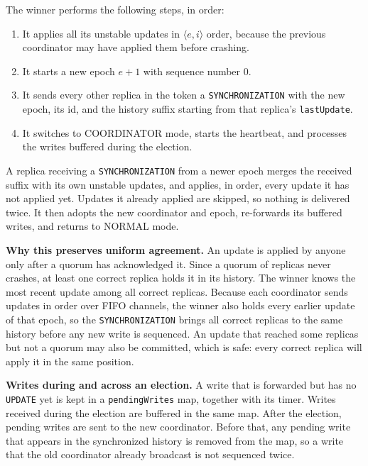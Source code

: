 The winner performs the following steps, in order:

\begin{enumerate}[nosep]
    \item It applies all its unstable updates in $\langle e,i\rangle$ order, because the previous coordinator may have applied them before crashing.
    \item It starts a new epoch $e+1$ with sequence number $0$.
    \item It sends every other replica in the token a \texttt{SYNCHRONIZATION} with the new epoch, its id, and the history suffix starting from that replica's \texttt{lastUpdate}.
    \item It switches to COORDINATOR mode, starts the heartbeat, and processes the writes buffered during the election.
\end{enumerate}

A replica receiving a \texttt{SYNCHRONIZATION} from a newer epoch merges the received suffix with its own unstable updates, and applies, in order, every update it has not applied yet. Updates it already applied are skipped, so nothing is delivered twice. It then adopts the new coordinator and epoch, re-forwards its buffered writes, and returns to NORMAL mode.

\textbf{Why this preserves uniform agreement.} An update is applied by anyone only after a quorum has acknowledged it. Since a quorum of replicas never crashes, at least one correct replica holds it in its history. The winner knows the most recent update among all correct replicas. Because each coordinator sends updates in order over FIFO channels, the winner also holds every earlier update of that epoch, so the \texttt{SYNCHRONIZATION} brings all correct replicas to the same history before any new write is sequenced. An update that reached some replicas but not a quorum may also be committed, which is safe: every correct replica will apply it in the same position.

\textbf{Writes during and across an election.} A write that is forwarded but has no \texttt{UPDATE} yet is kept in a \texttt{pendingWrites} map, together with its timer. Writes received during the election are buffered in the same map. After the election, pending writes are sent to the new coordinator. Before that, any pending write that appears in the synchronized history is removed from the map, so a write that the old coordinator already broadcast is not sequenced twice.
